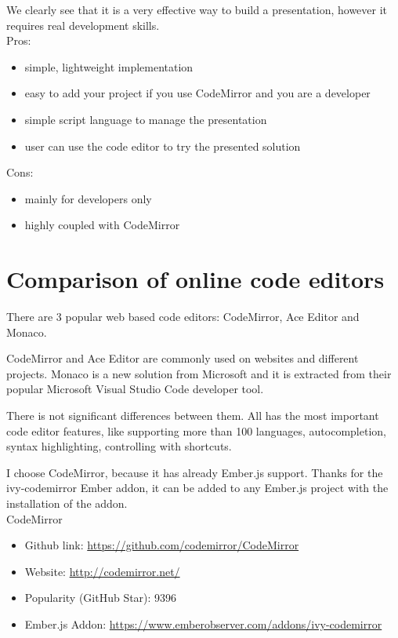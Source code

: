 \documentclass[11pt, a4paper, twoside, openright]{report}
\begin{document}
We clearly see that it is a very effective way to build a presentation, however it requires real development skills.\\

\noindent Pros:
\begin{itemize}[noitemsep]
\item simple, lightweight implementation
\item easy to add your project if you use CodeMirror and you are a developer
\item simple script language to manage the presentation
\item user can use the code editor to try the presented solution
\end{itemize}
Cons:
\begin{itemize}[noitemsep]
\item mainly for developers only
\item highly coupled with CodeMirror
\end{itemize}


\section{Comparison of online code editors}

There are 3 popular web based code editors: CodeMirror, Ace Editor and Monaco.

CodeMirror and Ace Editor are commonly used on websites and different projects. Monaco is a new solution from Microsoft and it is extracted from their popular Microsoft Visual Studio Code developer tool.

There is not significant differences between them. All has the most important code editor features, like supporting more than 100 languages, autocompletion, syntax highlighting, controlling with shortcuts.

I choose CodeMirror, because it has already Ember.js support. Thanks for the ivy-codemirror Ember addon, it can be added to any Ember.js project with the installation of the addon. \\

\noindent CodeMirror
\begin{itemize}[noitemsep]
\item Github link: \url{https://github.com/codemirror/CodeMirror}
\item Website: \url{http://codemirror.net/}
\item Popularity (GitHub Star): 9396
\item Ember.js Addon: \url{https://www.emberobserver.com/addons/ivy-codemirror} \\
\end{itemize}
\end{document}
